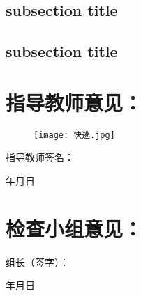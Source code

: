 \subsection{subsection title}
\lipsum[2-3]
\subsection{subsection title}
\lipsum[4-5]

\clearpage
\section*{指导教师意见：}

\begin{figure}[h]
    \centering
    \texttt{[image: 快逃.jpg]}
\end{figure}

\vspace{24bp}
\hfill 指导教师签名：\hspace{8\ccwd}

\vspace{24bp}
\hfill 年\hspace{2\ccwd}月\hspace{2\ccwd}日

\vspace{24bp}
\section*{检查小组意见：}

\lipsum[2]

\vspace{24bp}
\hfill 组长（签字）：\hspace{8\ccwd}

\vspace{24bp}
\hfill 年\hspace{2\ccwd}月\hspace{2\ccwd}日
